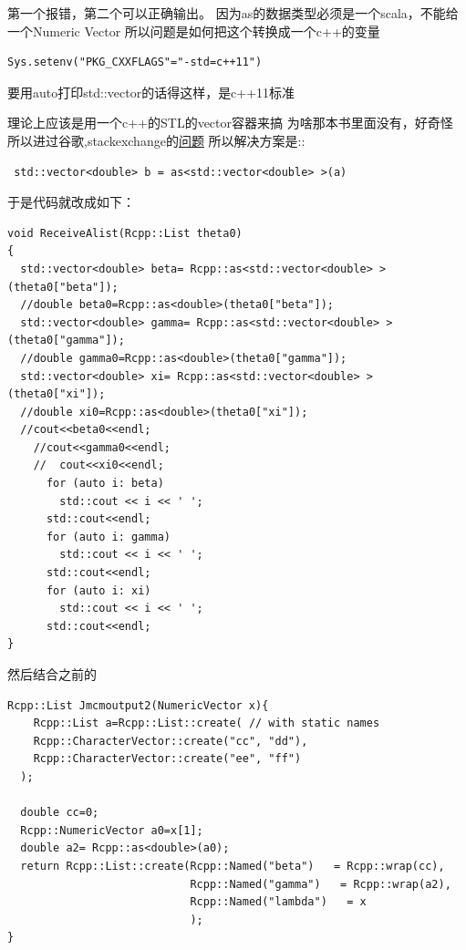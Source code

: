 \documentclass[
]{book}
\theoremstyle{definition}
\theoremstyle{definition}
\theoremstyle{definition}
\theoremstyle{remark}
\begin{document}
第一个报错，第二个可以正确输出。
因为as的数据类型必须是一个scala，不能给一个Numeric Vector
所以问题是如何把这个转换成一个c++的变量

\begin{verbatim}
Sys.setenv("PKG_CXXFLAGS"="-std=c++11")
\end{verbatim}

要用auto打印std::vector的话得这样，是c++11标准

理论上应该是用一个c++的STL的vector容器来搞
为啥那本书里面没有，好奇怪
所以进过谷歌,stackexchange的\href{https://stackoverflow.com/questions/37328978/convert-rvector-to-stdvector}{问题} 所以解决方案是::

\begin{verbatim}
 std::vector<double> b = as<std::vector<double> >(a)
\end{verbatim}

于是代码就改成如下：

\begin{verbatim}
void ReceiveAlist(Rcpp::List theta0)
{
  std::vector<double> beta= Rcpp::as<std::vector<double> >(theta0["beta"]);
  //double beta0=Rcpp::as<double>(theta0["beta"]);
  std::vector<double> gamma= Rcpp::as<std::vector<double> >(theta0["gamma"]);
  //double gamma0=Rcpp::as<double>(theta0["gamma"]);
  std::vector<double> xi= Rcpp::as<std::vector<double> >(theta0["xi"]);
  //double xi0=Rcpp::as<double>(theta0["xi"]);
  //cout<<beta0<<endl;
    //cout<<gamma0<<endl;
    //  cout<<xi0<<endl;
      for (auto i: beta)
        std::cout << i << ' ';
      std::cout<<endl;
      for (auto i: gamma)
        std::cout << i << ' ';
      std::cout<<endl;
      for (auto i: xi)
        std::cout << i << ' ';
      std::cout<<endl;
}
\end{verbatim}

然后结合之前的

\begin{verbatim}
Rcpp::List Jmcmoutput2(NumericVector x){
    Rcpp::List a=Rcpp::List::create( // with static names
    Rcpp::CharacterVector::create("cc", "dd"),
    Rcpp::CharacterVector::create("ee", "ff")
  );
  
  double cc=0;
  Rcpp::NumericVector a0=x[1];
  double a2= Rcpp::as<double>(a0);
  return Rcpp::List::create(Rcpp::Named("beta")   = Rcpp::wrap(cc),
                            Rcpp::Named("gamma")   = Rcpp::wrap(a2),
                            Rcpp::Named("lambda")   = x
                            );
}
\end{verbatim}
\end{document}
